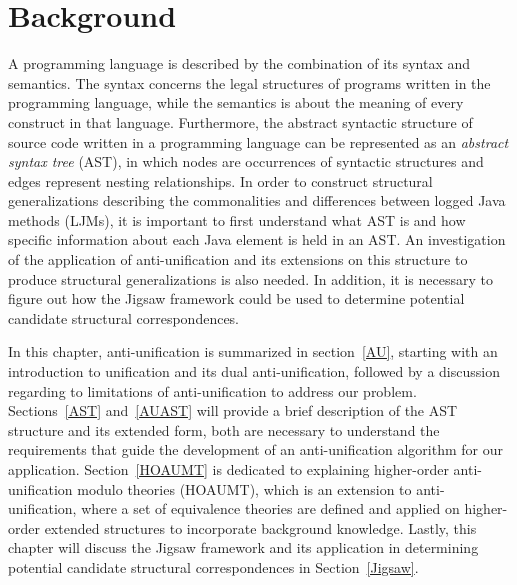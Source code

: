 \chapter{Background}  \label{background}


A programming language is described by the combination of its syntax and semantics. The syntax concerns the legal structures of programs written in the programming language, while the semantics is about the meaning of every construct in that language. Furthermore, the abstract syntactic structure of source code written in a programming language can be represented as an \emph{abstract syntax tree} (AST), in which nodes are occurrences of syntactic structures and edges represent nesting relationships. In order to construct structural generalizations describing the commonalities and differences between logged Java methods (LJMs), it is important to first understand what AST is and how specific information about each Java element is held in an AST\@. An investigation of the application of anti-unification and its extensions on this structure to produce structural generalizations is also needed. In addition, it is necessary to figure out how the Jigsaw framework could be used to determine potential candidate structural correspondences.

In this chapter, anti-unification is summarized in section~\ref{AU}, starting with an introduction to unification and its dual anti-unification, followed by a discussion regarding to limitations of anti-unification to address our problem.
Sections~\ref{AST} and~\ref{AUAST} will provide a brief description of the AST structure and its extended form, both are necessary to understand the requirements that guide the development of an anti-unification algorithm for our application.
Section~\ref{HOAUMT} is dedicated to explaining higher-order anti-unification modulo theories (HOAUMT), which is an extension to anti-unification, where a set of equivalence theories are defined and applied on higher-order extended structures to incorporate background knowledge.
Lastly, this chapter will discuss the Jigsaw framework and its application in determining potential candidate structural correspondences in Section~\ref{Jigsaw}.

